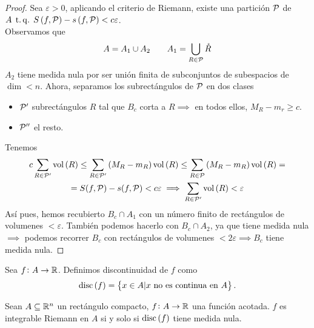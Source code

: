 \begin{proof}
    Sea $\varepsilon > 0$, aplicando el criterio de Riemann, existe una partición $\mathcal{P}$ de $A \operatorname{\;t.q.\;} S \left( f, \mathcal{P} \right) - s \left( f, \mathcal{P} \right) < c\varepsilon$. \\
    Observamos que
    \[
        A = A_1 \cup A_2 \qquad A_1 = \bigcup_{R \in \mathcal{P}} \mathring{R}
    \]
    $A_2$ tiene medida nula por ser unión finita de subconjuntos de subespacios de
    $\dim < n$. Ahora, separamos los subrectángulos de $\mathcal{P}$ en dos clases
    \begin{itemize}
        \item $\mathcal{P}^\prime$ subrectángulos $R$ tal que $B_c$ corta a $R \implies$ en
            todos ellos, $M_R - m_r \geq c$.
        \item $\mathcal{P}^{\prime\prime}$ el resto.
    \end{itemize}
    Tenemos
    \begin{gather*}
        c \sum_{R \in \mathcal{P}^\prime}\operatorname{vol}\left( R \right) \leq
        \sum_{R \in \mathcal{P}^\prime}\left( M_R - m_R \right) \operatorname{vol}\left( R \right) \leq
        \sum_{R \in \mathcal{P}} \left( M_R -m_R \right)\operatorname{vol} \left( R \right) =\\=
        S(f, \mathcal{P}) - s(f, \mathcal{P}) < c\varepsilon \implies \sum_{R \in \mathcal{P}^\prime}
        \operatorname{vol}\left( R \right) < \varepsilon
    \end{gather*}
    Así pues, hemos recubierto $B_c \cap A_1$ con un número finito de rectángulos de
    volumenes $< \varepsilon$. Tambi\'en podemos hacerlo con $B_c \cap A_2$, ya que
    tiene medida nula $\implies$ podemos recorrer $B_c$ con rectángulos de volumenes
    $< 2\varepsilon \implies B_c$ tiene medida nula.
\end{proof}

\begin{defi}
    Sea $f \colon A \to \mathbb{R}$. Definimos discontinuidad de $f$ como
    \[
        \operatorname{disc}\left( f \right) = \left\{x \in A \vert x \text{ no es continua en }A\right\}.
    \]
\end{defi}

\begin{teo}
    Sean $A \subseteq \mathbb{R}^n$ un rectángulo compacto, $f \colon A \to \mathbb{R}$ una
    función acotada. $f$ es integrable Riemann en $A$ si y solo si
    $\operatorname{disc}\left( f \right)$ tiene medida nula.
\end{teo}

